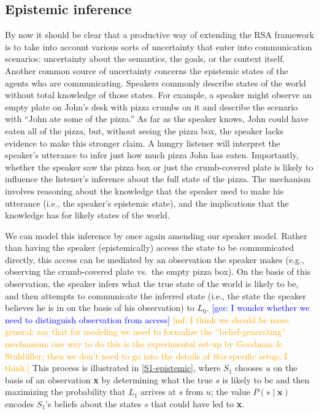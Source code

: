 \documentclass{sp}
\newcommand{\gcs}[1]{\textcolor{blue}{[gcs: #1]}}
\newcommand{\mf}[1]{\textcolor{orange}{[mf: #1]}}
\newcommand{\mht}[1]{\textcolor{purple}{[mht: #1]}}
\begin{document}

\subsection{Epistemic inference}

By now it should be clear that a productive way of extending the RSA framework is to take into account various sorts of uncertainty that enter into communication scenarios: uncertainty about the semantics, the goals, or the context itself. Another common source of uncertainty concerns the epistemic states of the agents who are communicating. Speakers commonly describe states of the world without total knowledge of those states. For example, a speaker might observe an empty plate on John's desk with pizza crumbs on it and describe the scenario with ``John ate some of the pizza.'' As far as the speaker knows, John could have eaten all of the pizza, but, without seeing the pizza box, the speaker lacks evidence to make this stronger claim. A hungry listener will interpret the speaker's utterance to infer just how much pizza John has eaten. Importantly, whether the speaker saw the pizza box or just the crumb-covered plate is likely to influence the listener's inference about the full state of the pizza. The mechanism involves reasoning about the knowledge that the speaker used to make his utterance (i.e., the speaker's epistemic state), and the implications that the knowledge has for likely states of the world.

We can model this inference by once again amending our speaker model. Rather than having the speaker (epistemically) access the state to be communicated directly, this access can be mediated by an observation the speaker makes (e.g., observing the crumb-covered plate vs.~the empty pizza box). On the basis of this observation, the speaker infers what the true state of the world is likely to be, and then attempts to communicate the inferred state (i.e., the state the speaker believes he is in on the basis of his observation) to $L_0$. \gcs{I wonder whether we need to distinguish observation from access} \mf{I think we should be more general: say that for modeling we need to formalize the ``belief-generating'' mechanism; one way to do this is the experimental set-up by Goodman \& Stuhl\"uller; then we don't need to go into the details of \textit{this} specific setup, I think.} This process is illustrated in \eqref{S1-epistemic}, where $S_1$ chooses $u$ on the basis of an observation \textbf{x} by determining what the true $s$ is likely to be and then maximizing the probability that $L_1$ arrives at $s$ from $u$; the value $P(s\mid \textbf{x})$ encodes $S_1$'s beliefs about the states $s$ that could have led to \textbf{x}.
\end{document}
